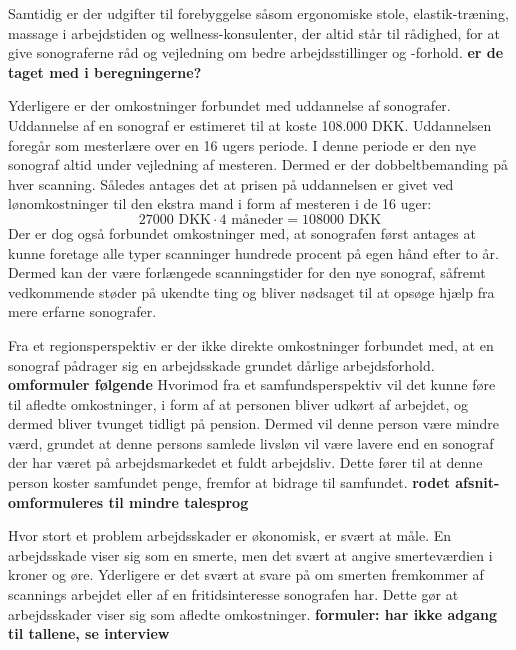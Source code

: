 Samtidig er der udgifter til forebyggelse såsom ergonomiske stole, elastik-træning, massage i arbejdstiden og wellness-konsulenter, der altid står til rådighed, for at give sonograferne råd og vejledning om bedre arbejdsstillinger og -forhold. \textbf{er de taget med i beregningerne?}

Yderligere er der omkostninger forbundet med uddannelse af sonografer. Uddannelse af en sonograf er estimeret til at koste 108.000 DKK. Uddannelsen foregår som mesterlære over en 16 ugers periode. I denne periode er den nye sonograf altid under vejledning af mesteren. Dermed er der dobbeltbemanding på hver scanning. Således antages det at prisen på uddannelsen er givet ved lønomkostninger til den ekstra mand i form af mesteren i de 16 uger:
\begin{equation}
27000 \text{ DKK}\cdot4 \text{ måneder} = 108000 \text{ DKK}
\end{equation}
Der er dog også forbundet omkostninger med, at sonografen først antages at kunne foretage alle typer scanninger hundrede procent på egen hånd efter to år. Dermed kan der være forlængede scanningstider for den nye sonograf, såfremt vedkommende støder på ukendte ting og bliver nødsaget til at opsøge hjælp fra mere erfarne sonografer. 

Fra et regionsperspektiv er der ikke direkte omkostninger forbundet med, at en sonograf pådrager sig en arbejdsskade grundet dårlige arbejdsforhold. \textbf{omformuler følgende }Hvorimod fra et samfundsperspektiv vil det kunne føre til afledte omkostninger, i form af at personen bliver udkørt af arbejdet, og dermed bliver tvunget tidligt på pension. Dermed vil denne person være mindre værd, grundet at denne persons samlede livsløn vil være lavere end en sonograf der har været på arbejdsmarkedet et fuldt arbejdsliv. Dette fører til at denne person koster samfundet penge, fremfor at bidrage til samfundet. \textbf{rodet afsnit- omformuleres til mindre talesprog}

Hvor stort et problem arbejdsskader er økonomisk, er svært at måle. En arbejdsskade viser sig som en smerte, men det svært at angive smerteværdien i kroner og øre. Yderligere er det svært at svare på om smerten fremkommer af scannings arbejdet eller af en fritidsinteresse sonografen har. Dette gør at arbejdsskader viser sig som afledte omkostninger. \textbf{formuler: har ikke adgang til tallene, se interview}


